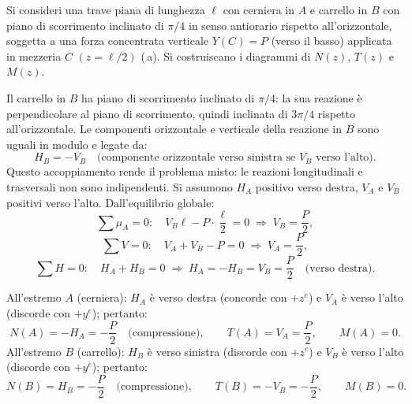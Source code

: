 \begin{esempio}
	Si consideri una trave piana di lunghezza $\ell$
	con cerniera in $A$ e carrello in $B$ con piano
	di scorrimento inclinato di $\pi/4$ in senso
	antiorario rispetto all'orizzontale, soggetta
	a una forza concentrata verticale $Y(C) = P$
	(verso il basso) applicata in mezzeria $C$
	$(z = \ell/2)$ (\,a).
	Si costruiscano i diagrammi di $N(z)$, $T(z)$
	e $M(z)$.
	
	\begin{svolgimento}
		



		

		Il carrello in $B$ ha piano di scorrimento
		inclinato di $\pi/4$: la sua reazione è
		perpendicolare al piano di scorrimento,
		quindi inclinata di $3\pi/4$ rispetto
		all'orizzontale. Le componenti orizzontale
		e verticale della reazione in $B$ sono
		uguali in modulo e legate da:
		\[
		H_B = -V_B
		\quad\text{(componente orizzontale verso
			sinistra se $V_B$ verso l'alto)}.
		\]
		Questo accoppiamento rende il problema misto:
		le reazioni longitudinali e trasversali non
		sono indipendenti.
		Si assumono $H_A$ positivo verso destra,
		$V_A$ e $V_B$ positivi verso l'alto.
		Dall'equilibrio globale:
		\[
		\sum \mu_A = 0:\quad
		V_B\ell - P\cdot\frac{\ell}{2} = 0
		\;\Rightarrow\;
		V_B = \frac{P}{2},
		\]
		\[
		\sum V = 0:\quad
		V_A + V_B - P = 0
		\;\Rightarrow\;
		V_A = \frac{P}{2},
		\]
		\[
		\sum H = 0:\quad
		H_A + H_B = 0
		\;\Rightarrow\;
		H_A = -H_B = V_B = \frac{P}{2}
		\quad\text{(verso destra)}.
		\]
		
		All'estremo $A$ (cerniera): $H_A$ è verso
		destra (concorde con $+z^e$) e $V_A$ è verso
		l'alto (discorde con $+y^e$); pertanto:
		\[
		N(A) = -H_A = -\frac{P}{2}
		\quad\text{(compressione)},
		\qquad
		T(A) = V_A = \frac{P}{2},
		\qquad
		M(A) = 0.
		\]
		All'estremo $B$ (carrello): $H_B$ è verso
		sinistra (discorde con $+z^e$) e $V_B$ è verso
		l'alto (discorde con $+y^e$); pertanto:
		\[
		N(B) = H_B = -\frac{P}{2}
		\quad\text{(compressione)},
		\qquad
		T(B) = -V_B = -\frac{P}{2},
		\qquad
		M(B) = 0.
		\]
		

\end{svolgimento}
\end{esempio}
